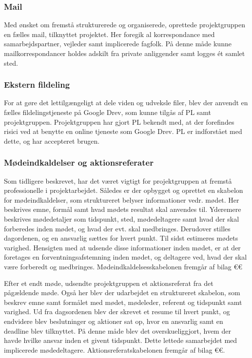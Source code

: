 	\subsubsection{Mail}
	Med ønsket om fremstå strukturerede og organiserede, oprettede projektgruppen en fælles mail, tilknyttet projektet. Her foregik al korrespondance med samarbejdspartner, vejleder samt implicerede fagfolk. På denne måde kunne mailkorrespondancer holdes adskilt fra private anliggender samt logges ét samlet sted. 
	\subsubsection{Ekstern fildeling}
	For at gøre det lettilgængeligt at dele viden og udveksle filer, blev der anvendt en fælles fildelingstjeneste på Google Drev, som kunne tilgås af PL samt projektgruppen.  
	Projektgruppen har gjort PL bekendt med, at der forefindes risici ved at benytte en online tjeneste som Google Drev. PL er indforstået med dette, og har accepteret brugen. 
	\subsubsection{Mødeindkaldelser og aktionsreferater}
	Som tidligere beskrevet, har det været vigtigt for projektgruppen at fremstå professionelle i projektarbejdet. Således er der opbygget og oprettet en skabelon for mødeindkaldelser, som struktureret belyser informationer vedr. mødet. Her beskrives emne, formål samt hvad mødets resultat skal anvendes til. Yderemere beskrives mødedetaljer som tidspunkt, sted, mødedeltagere samt hvad der skal forberedes inden mødet, og hvad der evt. skal medbringes. Derudover stilles dagordenen, og en ansvarlig sættes for hvert punkt. Til sidst estimeres mødets varighed. Hensigten med at udsende disse informationer inden mødet, er at der foretages en forventningsafstemning inden mødet, og deltagere ved, hvad der skal være forberedt og medbringes. Mødeindkaldelsesskabelonen fremgår af bilag €€ 
	
	Efter et endt møde, udsendte projektgruppen et aktionsreferat fra det pågældende møde. Også her blev der udarbejdet en struktureret skabelon, som beskrev emne samt formålet med mødet, mødeleder, referent og tidspunkt samt varighed. Ud fra dagsordenen blev der skrevet et resume til hvert punkt, og endvidere blev beslutninger og aktioner sat op, hvor en ansvarlig samt en deadline blev tilknyttet. På denne måde blev det overskueliggjort, hvem der havde hvilke ansvar inden et givent tidspunkt. Dette lettede samarbejdet med implicerede mødedeltagere. Aktionsreferatskabelonen fremgår af bilag €€.     
	
